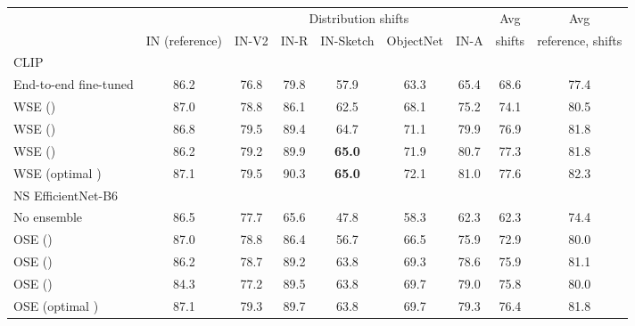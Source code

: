 \begin{table*}
\setlength\tabcolsep{3.2pt}
\small
\begin{center}
\begin{tabular}{lc|ccccc|cc}
\toprule
{} &            &             \multicolumn{5}{c|}{Distribution shifts}             & Avg &     Avg\\
{} &           IN (reference) &             IN-V2 &              IN-R &                 IN-Sketch &                 ObjectNet &              IN-A & shifts &     reference, shifts\\
\midrule
CLIP &            &  & & & &  &  & \\
\quad End-to-end fine-tuned                 &           86.2 &           76.8 &           79.8 &           57.9 &           63.3 &           65.4 &           68.6 &           77.4 \\  
\quad WSE ()     &           87.0 &           78.8 &           86.1 &           62.5 &           68.1 &           75.2 &           74.1 &           80.5 \\             
\quad WSE ()      &           86.8 &           79.5 &           89.4 &           64.7 &           71.1 &           79.9 &           76.9 &           81.8 \\             
\quad WSE ()      &           86.2 &           79.2 &           89.9 &  \textbf{65.0} &           71.9 &           80.7 &           77.3 &           81.8 \\             
\quad WSE (optimal )    &           87.1 &           79.5 &           90.3 &  \textbf{65.0} &           72.1 &           81.0 &           77.6 &           82.3 \\               
NS EfficientNet-B6  &            &  & & & &  &  & \\
\quad No ensemble      &           86.5 &           77.7 &           65.6 &           47.8 &           58.3 &           62.3 &           62.3 &           74.4 \\  
\quad OSE ()  &           87.0 &           78.8 &           86.4 &           56.7 &           66.5 &           75.9 &           72.9 &           80.0 \\                
\quad OSE ()   &           86.2 &           78.7 &           89.2 &           63.8 &           69.3 &           78.6 &           75.9 &           81.1 \\                
\quad OSE ()   &           84.3 &           77.2 &           89.5 &           63.8 &           69.7 &           79.0 &           75.8 &           80.0 \\                
\quad OSE (optimal ) &           87.1 &           79.3 &           89.7 &           63.8 &           69.7 &           79.3 &           76.4 &           81.8 \\                 


\end{tabular}
\end{center}
\end{table*}
